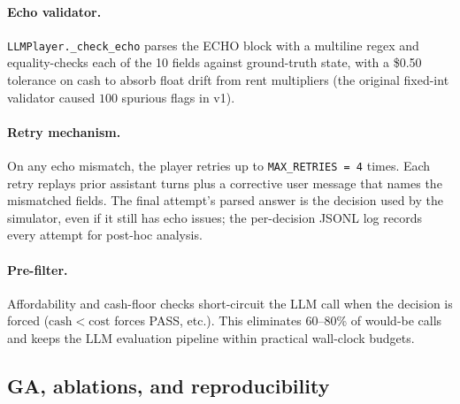 \documentclass[10pt]{article}
\begin{document}
\paragraph{Echo validator.} \texttt{LLMPlayer.\_check\_echo} parses
the ECHO block with a multiline regex and equality-checks each of
the 10 fields against ground-truth state, with a \$0.50 tolerance
on cash to absorb float drift from rent multipliers (the original
fixed-int validator caused $100$ spurious flags in v1).

\paragraph{Retry mechanism.} On any echo mismatch, the player
retries up to \texttt{MAX\_RETRIES = 4} times. Each retry replays
prior assistant turns plus a corrective user message that names
the mismatched fields. The final attempt's parsed answer is the
decision used by the simulator, even if it still has echo issues;
the per-decision JSONL log records every attempt for post-hoc
analysis.

\paragraph{Pre-filter.} Affordability and cash-floor checks
short-circuit the LLM call when the decision is forced
($\mathrm{cash} < \mathrm{cost}$ forces PASS, etc.). This
eliminates 60--80\% of would-be calls and keeps the LLM evaluation
pipeline within practical wall-clock budgets.

\subsection{GA, ablations, and reproducibility}\label{app:ga}
\end{document}
